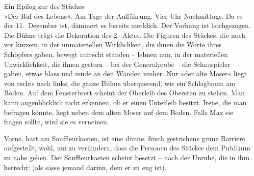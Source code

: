 \pstart
           \centering{}Ein Epilog zur \label{K_L01900-1v}\label{K_L01900-1} des
                  Stückes{\\}»Der Ruf des Lebens«.\pend
           {\vspace{1\baselineskip}}
\pstart
           Am Tage der Aufführung. Vier Uhr Nachmittags. Da es der 11. Dezember
               ist, dämmert es bereits merklich. Der Vorhang ist hochgezogen. Die Bühne trägt die
               Dekoration des 2. Aktes. Die
               Figuren des Stückes, die noch vor kurzem, in der unmateriellen Wirklichkeit, die
               ihnen die Worte ihres Schöpfers gaben, bewegt aufrecht standen – lehnen nun, in der
               materiellen Unwirklichkeit, die ihnen gestern – bei der Generalprobe – die
               Schauspieler gaben, etwas blass und müde an den Wänden umher. Nur »der alte Moser«
               liegt von rechts nach links, die ganze Bühne überquerend, wie ein Schlagbaum am
               Boden. Auf dem Fensterbrett scheint der Oberleib des Obersten zu stehen. Man kann
               augenblicklich nicht erkennen, ob er einen Unterleib besitzt. Irene, die man befragen
               könnte, liegt neben dem alten Moser auf dem Boden. Falls Max sie fragen sollte, wird
               sie es verneinen.\pend
           
\pstart
           Vorne, hart am Souffleurkasten, ist eine dünne, frisch gestrichene grüne Barriere
               aufgestellt, wohl, um zu verhindern, dass die Person\introOben{}en\introOben{} des
               Stückes dem Publikum zu nahe gehen. Der Souffleurkasten scheint besetzt – nach der
               Unruhe, die in ihm herrscht; (als sässe jemand darinn, dem er zu eng
               ist).\pend
           
